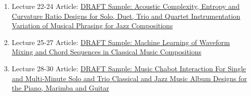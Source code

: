 \documentclass{TMLSStyleGuideResumeVitae}
\begin{document}
\begin{enumerate}
{%
Sample: A Semi-Markovian Model of Octave Frequency Visitation and Note Distribution in 
One Minute Classical and Jazz Music Compositions}
\item Lecture 22-24 Article: \href{https://github.com/MathematicalLearningSpace/Reading-Room-A/blob/master/Classroom%20Lecture%20Model%20Series_Course_4_Topic%201_Lecture_22_23_24_Journal_Article_8.tex}{DRAFT 
Sample: Acoustic Complexity, Entropy and Curvature Ratio Designs for 
Solo, Duet, Trio and Quartet Instrumentation Variation 
of Musical Phrasing for Jazz Compositions}
\item Lecture 25-27 Article: \href{https://github.com/MathematicalLearningSpace/Reading-Room-A/blob/master/Classroom%20Lecture%20Model%20Series_Course_4_Topic%201_Lecture_25_26_27_Journal_Article_9.tex}{DRAFT 
Sample: Machine Learning of Waveform Mixing and 
Chord Sequences in Classical Music Compositions}
\item Lecture 28-30 Article: \href{https://github.com/MathematicalLearningSpace/Reading-Room-A/blob/master/Classroom%20Lecture%20Model%20Series_Course_4_Topic%201_Lecture_28_29_30_Journal_Article_10.tex}{DRAFT 
Sample: Music Chabot Interaction For Single and 
Multi-Minute Solo and Trio Classical and 
Jazz Music Album Designs for the Piano, Marimba and Guitar}
\end{enumerate}
\end{document}
